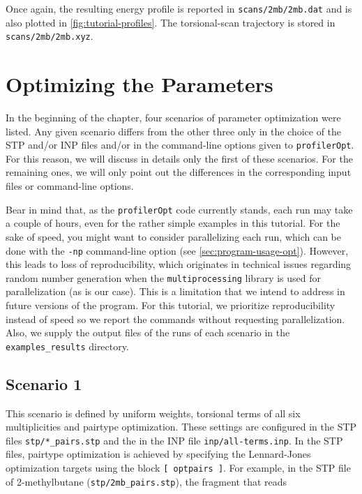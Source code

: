 \documentclass[10pt,a4paper]{report}
\numberwithin{equation}{section}
\newcommand{\under}{\_}
\newcommand{\profileropt}[0]{\texttt{profilerOpt}}
\begin{document}
\noindent Once again, the resulting energy profile is reported in
\texttt{scans/2mb/2mb.dat} and is also plotted in
\autoref{fig:tutorial-profiles}.
%
The torsional-scan trajectory is stored in \texttt{scans/2mb/2mb.xyz}.
%

\section{Optimizing the Parameters}
\label{sec:tutorial-profileropt}

In the beginning of the chapter, four scenarios of parameter
optimization were listed.
%
Any given scenario differs from the other three only in the choice of
the STP and/or INP files and/or in the command-line options given to
\profileropt{}.
%
For this reason, we will discuss in details only the first of these
scenarios.
%
For the remaining ones, we will only point out the differences in the
corresponding input files or command-line options.
%

Bear in mind that, as the \profileropt{} code currently stands, each
run may take a couple of hours, even for the rather simple examples in
this tutorial.
%
For the sake of speed, you might want to consider parallelizing each
run, which can be done with the \texttt{-np} command-line option (see
\autoref{sec:program-usage-opt}).
%
However, this leads to loss of reproducibility, which originates in
technical issues regarding random number generation when the
\texttt{multiprocessing} library is used for parallelization (as is
our case).
%
This is a limitation that we intend to address in future versions of
the program.
%
For this tutorial, we prioritize reproducibility instead of speed so
we report the commands without requesting parallelization.
%
Also, we supply the output files of the runs of each scenario in the
\texttt{examples\_results} directory.

\subsection{Scenario 1}
\label{sec:tutorial-scenario-1}

This scenario is defined by uniform weights, torsional terms of all
six multiplicities and pairtype optimization.
%
These settings are configured in the STP files
\texttt{stp/*\under{}pairs.stp} and the in the INP file
\texttt{inp/all-terms.inp}.
%
In the STP files, pairtype optimization is achieved by specifying the
Lennard-Jones optimization targets using the block
\texttt{[~optpairs~]}.
%
%
For example, in the STP file of 2-methylbutane
(\texttt{stp/2mb\under{}pairs.stp}), the fragment that reads
\end{document}
